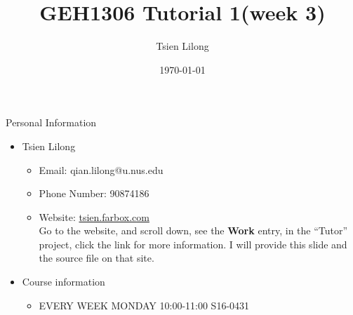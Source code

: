 \documentclass{beamer}
\author{Tsien Lilong}
\title{GEH1306 Tutorial 1(week 3)}
\date{\today}
\begin{document}
\titlepageframe


\begin{tframe}{Personal Information}
  \begin{itemize}
    \item Tsien Lilong
          \begin{itemize}
            \item Email: qian.lilong@u.nus.edu
            \item Phone Number: 90874186
            \item Website: \url{tsien.farbox.com}\\
                  Go to the website, and scroll down, see the \textbf{Work} entry, in the ``Tutor'' project, click the link
                  for more information. I will provide this slide and the source  file on that site.
          \end{itemize}
    \item Course information
          \begin{itemize}
            \item EVERY WEEK	MONDAY	10:00-11:00	S16-0431
          \end{itemize}

          
  \end{itemize}
\end{tframe}
\end{document}
